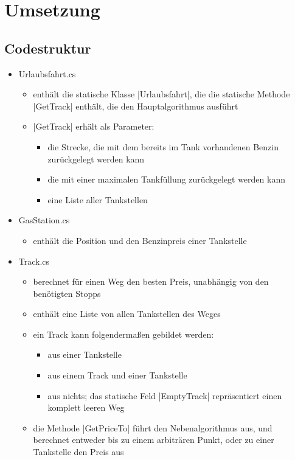 \documentclass[a4paper,10pt,ngerman]{scrartcl}
\begin{document}
\newpage

\section{Umsetzung}

\subsection{Codestruktur}

\begin{itemize}
	\item Urlaubsfahrt.cs
	\begin{itemize}
		\item enthält die statische Klasse |Urlaubsfahrt|, die die statische Methode |GetTrack| enthält, die den Hauptalgorithmus ausführt
		\item |GetTrack| erhält als Parameter:
		 \begin{itemize}
		 	\item die Strecke, die mit dem bereits im Tank vorhandenen Benzin zurückgelegt werden kann
		 	\item die mit einer maximalen Tankfüllung zurückgelegt werden kann
		 	\item eine Liste aller Tankstellen
		\end{itemize}
    \end{itemize}
    
    \item GasStation.cs
    \begin{itemize}
        \item enthält die Position und den Benzinpreis einer Tankstelle
    \end{itemize}

    \item Track.cs
	\begin{itemize}
		\item berechnet für einen Weg den besten Preis, unabhängig von den benötigten Stopps
		\item enthält eine Liste von allen Tankstellen des Weges
		\item ein Track kann folgendermaßen gebildet werden:
		\begin{itemize}
			\item aus einer Tankstelle
			\item aus einem Track und einer Tankstelle
			\item aus nichts; das statische Feld |EmptyTrack| repräsentiert einen komplett leeren Weg
		\end{itemize}
        \item die Methode |GetPriceTo| führt den Nebenalgorithmus aus, und berechnet entweder bis zu einem arbiträren Punkt, oder zu einer Tankstelle den Preis aus
    \end{itemize}


\end{itemize}
\end{document}
